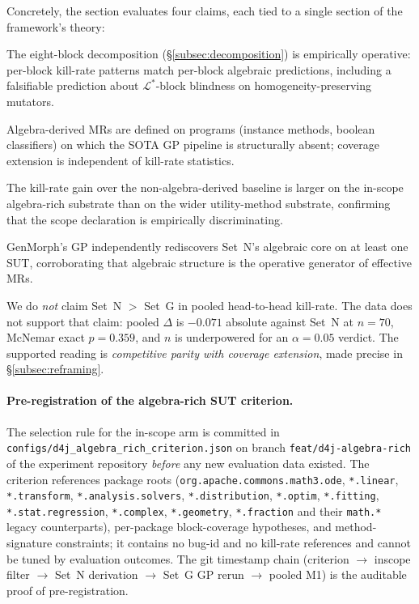 Concretely, the section evaluates four claims, each tied to a single
section of the framework's theory:
\begin{description}[leftmargin=*,nosep]
  \item[Claim B (mechanism operativeness).] The eight-block
        decomposition (\S\ref{subsec:decomposition}) is empirically
        operative: per-block kill-rate patterns match per-block
        algebraic predictions, including a falsifiable prediction
        about $\mathcal{L}^{*}$-block blindness on
        homogeneity-preserving mutators.
  \item[Claim C (coverage extension).] Algebra-derived MRs are
        defined on programs (instance methods, boolean classifiers)
        on which the SOTA GP pipeline is structurally absent;
        coverage extension is independent of kill-rate statistics.
  \item[Claim D (scope discriminance).] The kill-rate gain over the
        non-algebra-derived baseline is larger on the in-scope
        algebra-rich substrate than on the wider utility-method
        substrate, confirming that the scope declaration is
        empirically discriminating.
  \item[Claim F (cross-pipeline rediscovery).] GenMorph's GP
        independently rediscovers Set~N's algebraic core on at
        least one SUT, corroborating that algebraic structure is the
        operative generator of effective MRs.
\end{description}

We do \emph{not} claim Set~N $>$ Set~G in pooled head-to-head
kill-rate. The data does not support that claim: pooled $\Delta$ is
$-0.071$ absolute against Set~N at $n = 70$, McNemar exact
$p = 0.359$, and $n$ is underpowered for an $\alpha = 0.05$ verdict.
The supported reading is \emph{competitive parity with coverage
extension}, made precise in \S\ref{subsec:reframing}.

\paragraph{Pre-registration of the algebra-rich SUT criterion.}
The selection rule for the in-scope arm is committed in
\texttt{configs/d4j\_algebra\_rich\_criterion.json} on branch
\texttt{feat/d4j-algebra-rich} of the experiment repository
\emph{before} any new evaluation data existed. The criterion
references package roots (\texttt{org.apache.commons.math3.ode},
\texttt{*.linear}, \texttt{*.transform},
\texttt{*.analysis.solvers}, \texttt{*.distribution},
\texttt{*.optim}, \texttt{*.fitting}, \texttt{*.stat.regression},
\texttt{*.complex}, \texttt{*.geometry}, \texttt{*.fraction} and their
\texttt{math.*} legacy counterparts), per-package block-coverage
hypotheses, and method-signature constraints; it contains no bug-id
and no kill-rate references and cannot be tuned by evaluation
outcomes. The git timestamp chain (criterion $\rightarrow$ inscope
filter $\rightarrow$ Set~N derivation $\rightarrow$ Set~G GP rerun
$\rightarrow$ pooled M1) is the auditable proof of pre-registration.


